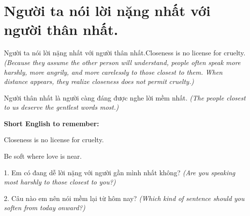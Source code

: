 \section{Người ta nói lời nặng nhất với người thân nhất.}
\begin{truyen}{Người ta nói lời nặng nhất với người thân nhất.}{Closeness is no license for cruelty.}
\textit{(Because they assume the other person will understand, people often speak more harshly, more angrily, and more carelessly to those closest to them. When distance appears, they realize closeness does not permit cruelty.)}
\end{truyen}
\begin{baihoc}
Người thân nhất là người càng đáng được nghe lời mềm nhất.
\textit{(The people closest to us deserve the gentlest words most.)}
\end{baihoc}
\begin{ghinhoanh}
\textbf{Short English to remember:}

Closeness is no license for cruelty.

Be soft where love is near.
\end{ghinhoanh}
\begin{tuhocnhanh}
1. Em có đang dễ lời nặng với người gần mình nhất không? \textit{(Are you speaking most harshly to those closest to you?)}

2. Câu nào em nên nói mềm lại từ hôm nay? \textit{(Which kind of sentence should you soften from today onward?)}
\end{tuhocnhanh}
\ngancach

